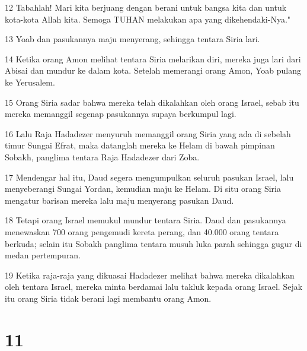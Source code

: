 \par 12 Tabahlah! Mari kita berjuang dengan berani untuk bangsa kita dan untuk kota-kota Allah kita. Semoga TUHAN melakukan apa yang dikehendaki-Nya."
\par 13 Yoab dan pasukannya maju menyerang, sehingga tentara Siria lari.
\par 14 Ketika orang Amon melihat tentara Siria melarikan diri, mereka juga lari dari Abisai dan mundur ke dalam kota. Setelah memerangi orang Amon, Yoab pulang ke Yerusalem.
\par 15 Orang Siria sadar bahwa mereka telah dikalahkan oleh orang Israel, sebab itu mereka memanggil segenap pasukannya supaya berkumpul lagi.
\par 16 Lalu Raja Hadadezer menyuruh memanggil orang Siria yang ada di sebelah timur Sungai Efrat, maka datanglah mereka ke Helam di bawah pimpinan Sobakh, panglima tentara Raja Hadadezer dari Zoba.
\par 17 Mendengar hal itu, Daud segera mengumpulkan seluruh pasukan Israel, lalu menyeberangi Sungai Yordan, kemudian maju ke Helam. Di situ orang Siria mengatur barisan mereka lalu maju menyerang pasukan Daud.
\par 18 Tetapi orang Israel memukul mundur tentara Siria. Daud dan pasukannya menewaskan 700 orang pengemudi kereta perang, dan 40.000 orang tentara berkuda; selain itu Sobakh panglima tentara musuh luka parah sehingga gugur di medan pertempuran.
\par 19 Ketika raja-raja yang dikuasai Hadadezer melihat bahwa mereka dikalahkan oleh tentara Israel, mereka minta berdamai lalu takluk kepada orang Israel. Sejak itu orang Siria tidak berani lagi membantu orang Amon.

\chapter{11}

